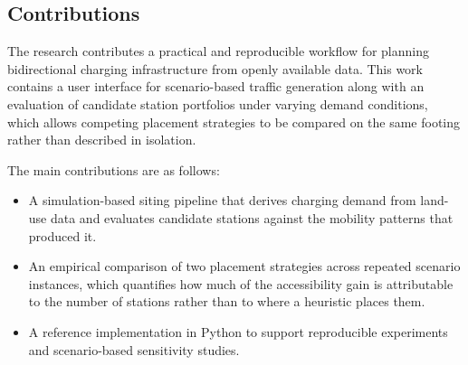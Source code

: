 \subsection{Contributions}
\label{subsec:contributions}
The research contributes a practical and reproducible workflow for planning bidirectional charging infrastructure from openly available data. This work contains a user interface for scenario-based traffic generation along with an evaluation of candidate station portfolios under varying demand conditions, which allows competing placement strategies to be compared on the same footing rather than described in isolation.

The main contributions are as follows:
\begin{itemize}
	\item A simulation-based siting pipeline that derives charging demand from land-use data and evaluates candidate stations against the mobility patterns that produced it.
	\item An empirical comparison of two placement strategies across repeated scenario instances, which quantifies how much of the accessibility gain is attributable to the number of stations rather than to where a heuristic places them.
	\item A reference implementation in Python to support reproducible experiments and scenario-based sensitivity studies.
\end{itemize}
